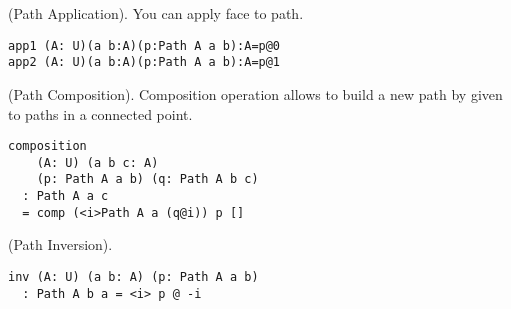 \documentclass{article}
\begin{document}
\begin{definition} (Path Application).
You can apply face to path.
\begin{lstlisting}
app1 (A: U)(a b:A)(p:Path A a b):A=p@0
app2 (A: U)(a b:A)(p:Path A a b):A=p@1
\end{lstlisting}
\end{definition}

\begin{definition} (Path Composition).
Composition operation allows to build a new path by given to paths
in a connected point.
\begin{center}
\end{center}
\begin{lstlisting}
composition
    (A: U) (a b c: A)
    (p: Path A a b) (q: Path A b c)
  : Path A a c
  = comp (<i>Path A a (q@i)) p []
\end{lstlisting}
\end{definition}

\begin{theorem} (Path Inversion).
\begin{lstlisting}
inv (A: U) (a b: A) (p: Path A a b)
  : Path A b a = <i> p @ -i
\end{lstlisting}
\end{theorem}
\end{document}
